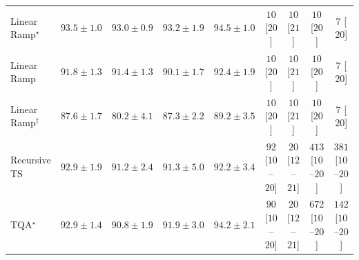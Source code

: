 \begin{tabular}{l|cccc|cccc|}
Linear Ramp$^\star$ & {\cellcolor[HTML]{034973}} \color[HTML]{F1F1F1} $93.5\pm 1.0$ & {\cellcolor[HTML]{034C78}} \color[HTML]{F1F1F1} $93.0\pm 0.9$ & {\cellcolor[HTML]{034B76}} \color[HTML]{F1F1F1} $93.2\pm 1.9$ & {\cellcolor[HTML]{03446A}} \color[HTML]{F1F1F1} $94.5\pm 1.0$ & {\cellcolor[HTML]{FFF7F3}} \color[HTML]{000000} $10$ [$20$] & {\cellcolor[HTML]{FFF7F3}} \color[HTML]{000000} $10$ [$21$] & {\cellcolor[HTML]{FFF7F3}} \color[HTML]{000000} $10$ [$20$] & {\cellcolor[HTML]{FFF7F3}} \color[HTML]{000000} $7$ [$20$] \\
Linear Ramp & {\cellcolor[HTML]{045483}} \color[HTML]{F1F1F1} $91.8\pm 1.3$ & {\cellcolor[HTML]{045687}} \color[HTML]{F1F1F1} $91.4\pm 1.3$ & {\cellcolor[HTML]{045C90}} \color[HTML]{F1F1F1} $90.1\pm 1.7$ & {\cellcolor[HTML]{03517E}} \color[HTML]{F1F1F1} $92.4\pm 1.9$ & {\cellcolor[HTML]{FFF7F3}} \color[HTML]{000000} $10$ [$20$] & {\cellcolor[HTML]{FFF7F3}} \color[HTML]{000000} $10$ [$21$] & {\cellcolor[HTML]{FFF7F3}} \color[HTML]{000000} $10$ [$20$] & {\cellcolor[HTML]{FFF7F3}} \color[HTML]{000000} $7$ [$20$] \\
Linear Ramp$^\dagger$ & {\cellcolor[HTML]{0566A0}} \color[HTML]{F1F1F1} $87.6\pm 1.7$ & {\cellcolor[HTML]{2F8BBE}} \color[HTML]{F1F1F1} $80.2\pm 4.1$ & {\cellcolor[HTML]{0567A2}} \color[HTML]{F1F1F1} $87.3\pm 2.2$ & {\cellcolor[HTML]{046096}} \color[HTML]{F1F1F1} $89.2\pm 3.5$ & {\cellcolor[HTML]{FFF7F3}} \color[HTML]{000000} $10$ [$20$] & {\cellcolor[HTML]{FFF7F3}} \color[HTML]{000000} $10$ [$21$] & {\cellcolor[HTML]{FFF7F3}} \color[HTML]{000000} $10$ [$20$] & {\cellcolor[HTML]{FFF7F3}} \color[HTML]{000000} $7$ [$20$] \\
Recursive TS & {\cellcolor[HTML]{034D79}} \color[HTML]{F1F1F1} $92.9\pm 1.9$ & {\cellcolor[HTML]{045788}} \color[HTML]{F1F1F1} $91.2\pm 2.4$ & {\cellcolor[HTML]{045788}} \color[HTML]{F1F1F1} $91.3\pm 5.0$ & {\cellcolor[HTML]{045280}} \color[HTML]{F1F1F1} $92.2\pm 3.4$ & {\cellcolor[HTML]{FDE3E0}} \color[HTML]{000000} $92$ [$10$--$20$] & {\cellcolor[HTML]{FFF4F0}} \color[HTML]{000000} $20$ [$12$--$21$] & {\cellcolor[HTML]{F25D9F}} \color[HTML]{F1F1F1} $413$ [$10$--$20$] & {\cellcolor[HTML]{F770A4}} \color[HTML]{F1F1F1} $381$ [$10$--$20$] \\
TQA$^\star$ & {\cellcolor[HTML]{034D79}} \color[HTML]{F1F1F1} $92.9\pm 1.4$ & {\cellcolor[HTML]{045A8D}} \color[HTML]{F1F1F1} $90.8\pm 1.9$ & {\cellcolor[HTML]{045382}} \color[HTML]{F1F1F1} $91.9\pm 3.0$ & {\cellcolor[HTML]{03456C}} \color[HTML]{F1F1F1} $94.2\pm 2.1$ & {\cellcolor[HTML]{FDE4E0}} \color[HTML]{000000} $90$ [$10$--$20$] & {\cellcolor[HTML]{FFF4F0}} \color[HTML]{000000} $20$ [$12$--$21$] & {\cellcolor[HTML]{810178}} \color[HTML]{F1F1F1} $672$ [$10$--$20$] & {\cellcolor[HTML]{FDD6D2}} \color[HTML]{000000} $142$ [$10$--$20$] \\

\end{tabular}
